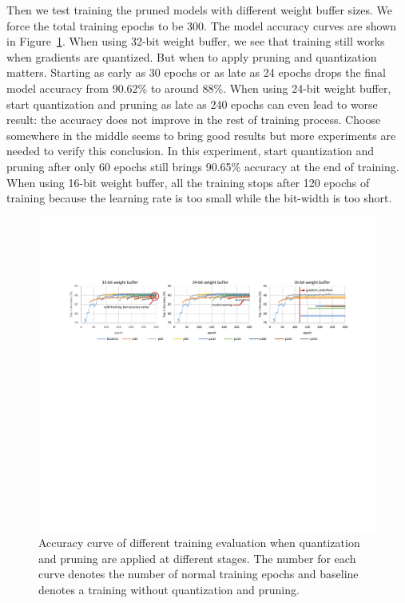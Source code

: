 Then we test training the pruned models with different weight buffer sizes. We force the total training epochs to be 300. The model accuracy curves are shown in Figure~\ref{fig:fixed_train_exp}. When using 32-bit weight buffer, we see that training still works when gradients are quantized. But when to apply pruning and quantization matters. Starting as early as 30 epochs or as late as 24 epochs drops the final model accuracy from 90.62\% to around 88\%. When using 24-bit weight buffer, start quantization and pruning as late as 240 epochs can even lead to worse result: the accuracy does not improve in the rest of training process. Choose somewhere in the middle seems to bring good results but more experiments are needed to verify this conclusion. In this experiment, start quantization and pruning after only 60 epochs still brings 90.65\% accuracy at the end of training. When using 16-bit weight buffer, all the training stops after 120 epochs of training because the learning rate is too small while the bit-width is too short.

\begin{figure}[tb]
  \centering
  \includegraphics[width=2.0\columnwidth]{figures/fixed_train_exp.pdf}
  \caption{Accuracy curve of different training evaluation when quantization and pruning are applied at different stages. The number for each curve denotes the number of normal training epochs and baseline denotes a training without quantization and pruning. }
  \label{fig:fixed_train_exp}
\end{figure}

